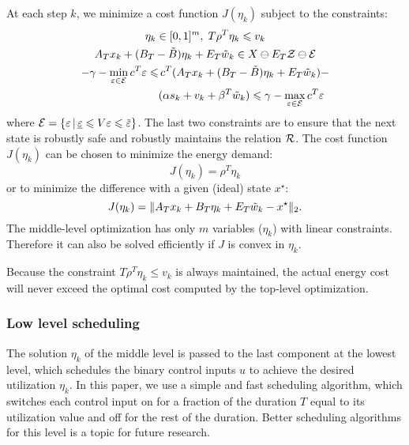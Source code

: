 At each step $k$, we minimize a cost function $J(\eta_{k})$ subject to the constraints:
\begin{gather*}
  \eta_{k} \in [0,1]^{m}, \; T \rho^{T} \eta_{k} \leqslant v_{k} \\
  A_{T} x_{k} + (B_{T} - \tilde{B}) \eta_{k} + E_{T} \tilde{w}_{k} \in X \ominus E_{T} \ZSet \ominus \ESet \\
  \begin{aligned}
    -\gamma - \min_{\varepsilon \in \ESet} c^{T} \varepsilon %
    \leqslant & \, c^{T}(A_{T} x_{k} + (B_{T} - \tilde{B}) \eta_{k}
    + %
    E_{T} \tilde{w}_{k}) - \\
    & (\alpha s_{k} + v_{k} + \beta^{T} \tilde{w}_{k}) \leqslant \gamma
    - \max_{\varepsilon \in \ESet} c^{T}
    \varepsilon %
  \end{aligned}
\end{gather*}
where $\ESet = \{\varepsilon \,|\, \underline{\varepsilon} \leqslant V \varepsilon \leqslant \overbar{\varepsilon}\}$.
The last two constraints are to ensure that the next state is robustly safe and robustly maintains the relation $\mathcal{R}$.
The cost function $J(\eta_{k})$ can be chosen to minimize the energy demand:
\begin{equation*}
  J(\eta_{k}) = \rho^{T} \eta_{k}
\end{equation*}
or to minimize the difference with a given (ideal) state $x^{\star}$:
\begin{equation*}
  J(\eta_{k}) = \| A_{T} x_{k} + B_{T} \eta_{k} + E_{T} \tilde{w}_{k} - x^{\star} \|_{2} \text.
\end{equation*}
%
The middle-level optimization has only $m$ variables ($\eta_{k}$) with linear constraints.
Therefore it can also be solved efficiently if $J$ is convex in $\eta_{k}$.

Because the constraint $T \rho^{T} \eta_{k} \leqslant v_{k}$ is always maintained, the actual energy cost will never exceed the optimal cost computed by the top-level optimization.


\subsubsection{Low level scheduling}

The solution $\eta_{k}$ of the middle level is passed to the last component at the lowest level, which schedules the binary control inputs $u$ to achieve the desired utilization $\eta_{k}$.
In this paper, we use a simple and fast scheduling algorithm, which switches each control input on for a fraction of the duration $T$ equal to its utilization value and off for the rest of the duration.
Better scheduling algorithms for this level is a topic for future research.

